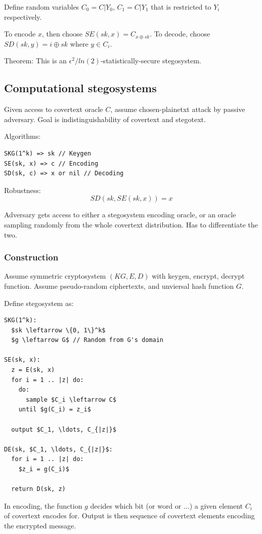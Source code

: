 \documentclass[a4paper]{scrreprt}
\begin{document}
Define random variables $C_0 = C | Y_0$, $C_1 = C | Y_1$ that is restricted to
$Y_i$ respectively.

To encode $x$, then choose $SE(sk, x) = C_{x \oplus sk}$. To decode, choose
$SD(sk, y) = i \oplus sk$ where $y \in C_i$.

Theorem: This is an $\epsilon^2 / ln(2)$-statistically-secure stegosystem.

\subsection{Computational stegosystems}

Given access to covertext oracle $C$, assume chosen-plainetxt attack by passive
adversary. Goal is indistinguishability of covertext and stegotext.

Algorithms:
\begin{lstlisting}
SKG(1^k) => sk // Keygen
SE(sk, x) => c // Encoding
SD(sk, c) => x or nil // Decoding
\end{lstlisting}

Robustness:
\[
		SD(sk, SE(sk, x)) = x
\]

Adversary gets access to either a stegosystem encoding oracle, or an oracle
sampling randomly from the whole covertext distribution. Has to differentiate
the two.

\subsubsection{Construction}

Assume symmetric cryptosystem $(KG, E, D)$ with keygen, encrypt, decrypt
function. Assume pseudo-random ciphertexts, and unviersal hash function $G$.

Define stegosystem as:
\begin{lstlisting}[mathescape]
SKG(1^k):
  $sk \leftarrow \{0, 1\}^k$
  $g \leftarrow G$ // Random from G's domain

SE(sk, x):
  z = E(sk, x)
  for i = 1 .. |z| do:
    do:
      sample $C_i \leftarrow C$
    until $g(C_i) = z_i$
  
  output $C_1, \ldots, C_{|z|}$

DE(sk, $C_1, \ldots, C_{|z|}$:
  for i = 1 .. |z| do:
    $z_i = g(C_i)$

  return D(sk, z)
\end{lstlisting}

In encoding, the function $g$ decides which bit (or word or ...) a given
element $C_i$ of covertext encodes for. Output is then sequence of covertext
elements encoding the encrypted message.
\end{document}
